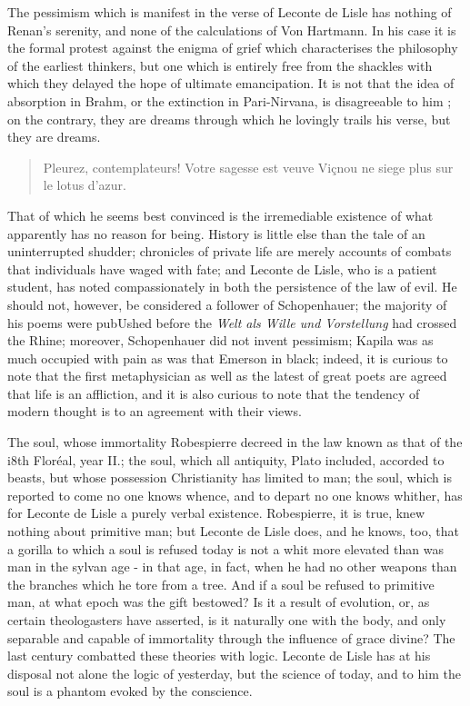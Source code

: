 \documentclass[]{book}
\begin{document}
The pessimism which is manifest in the verse of Leconte de Lisle has
nothing of Renan's serenity, and none of the calculations of Von
Hartmann. In his case it is the formal protest against the enigma of
grief which characterises the philosophy of the earliest thinkers, but
one which is entirely free from the shackles with which they delayed the
hope of ultimate emancipation. It is not that the idea of absorption in
Brahm, or the extinction in Pari-Nirvana, is disagreeable to him ; on
the contrary, they are dreams through which he lovingly trails his
verse, but they are dreams.

\begin{quote}
Pleurez, contemplateurs! Votre sagesse est veuve Viçnou ne siege plus
sur le lotus d'azur.
\end{quote}

That of which he seems best convinced is the irremediable existence of
what apparently has no reason for being. History is little else than the
tale of an uninterrupted shudder; chronicles of private life are merely
accounts of combats that individuals have waged with fate; and Leconte
de Lisle, who is a patient student, has noted compassionately in both
the persistence of the law of evil. He should not, however, be
considered a follower of Schopenhauer; the majority of his poems were
pubUshed before the \emph{Welt als Wille und Vorstellung} had crossed
the Rhine; moreover, Schopenhauer did not invent pessimism; Kapila was
as much occupied with pain as was that Emerson in black; indeed, it is
curious to note that the first metaphysician as well as the latest of
great poets are agreed that life is an affliction, and it is also
curious to note that the tendency of modern thought is to an agreement
with their views.

The soul, whose immortality Robespierre decreed in the law known as that
of the i8th Floréal, year II.; the soul, which all antiquity, Plato
included, accorded to beasts, but whose possession Christianity has
limited to man; the soul, which is reported to come no one knows whence,
and to depart no one knows whither, has for Leconte de Lisle a purely
verbal existence. Robespierre, it is true, knew nothing about primitive
man; but Leconte de Lisle does, and he knows, too, that a gorilla to
which a soul is refused today is not a whit more elevated than was man
in the sylvan age - in that age, in fact, when he had no other weapons
than the branches which he tore from a tree. And if a soul be refused to
primitive man, at what epoch was the gift bestowed? Is it a result of
evolution, or, as certain theologasters have asserted, is it naturally
one with the body, and only separable and capable of immortality through
the influence of grace divine? The last century combatted these theories
with logic. Leconte de Lisle has at his disposal not alone the logic of
yesterday, but the science of today, and to him the soul is a phantom
evoked by the conscience.
\end{document}

